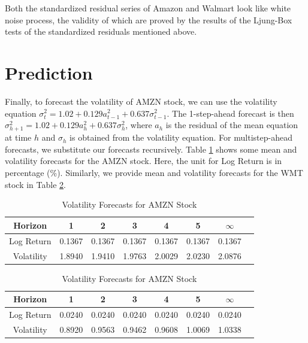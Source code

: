 \documentclass[paper=a4, fontsize=11pt]{article}
\begin{document}
Both the standardized residual series of Amazon and Walmart look like white noise process, the validity of which are proved by the results of the Ljung-Box tests of the standardized residuals mentioned above.

\section{Prediction}
Finally, to forecast the volatility of AMZN stock, we can use the volatility equation $\sigma_t^2 = 1.02+0.129a_{t-1}^2+0.637\sigma_{t-1}^2$. The 1-step-ahead forecast is then $\sigma_{h+1}^2 = 1.02+0.129a_h^2+0.637\sigma_h^2$, where $a_h$ is the residual of the mean equation at time $h$ and $\sigma_h$ is obtained from the volatility equation. For multistep-ahead forecasts, we substitute our forecasts recursively. Table \ref{fc_amzn} shows some mean and volatility forecasts for the AMZN stock. Here, the unit for Log Return is in percentage (\%). Similarly, we provide mean and volatility forecasts for the WMT stock in Table \ref{fc_wmt}.

\begin{table}
\caption{Volatility Forecasts for AMZN Stock}
  \centering
\begin{tabular}[!htbp]{c|ccccccc}
\hline Horizon & 1 & 2 & 3 & 4 & 5 & $\infty$ \\ 
\hline Log Return & 0.1367 & 0.1367 & 0.1367 & 0.1367 & 0.1367 & 0.1367 \\
Volatility & 1.8940 & 1.9410 & 1.9763 &  2.0029 & 2.0230 & 2.0876\\
\hline
\end{tabular}
\label{fc_amzn}
\end{table}

\begin{table}
\caption{Volatility Forecasts for AMZN Stock}
  \centering
\begin{tabular}[!htbp]{c|ccccccc}
\hline Horizon & 1 & 2 & 3 & 4 & 5 & $\infty$ \\ 
\hline Log Return & 0.0240 & 0.0240 & 0.0240 & 0.0240 & 0.0240 & 0.0240 \\
Volatility & 0.8920 & 0.9563 & 0.9462 & 0.9608 & 1.0069 & 1.0338\\
\hline
\end{tabular}
\label{fc_wmt}
\end{table}
\end{document}
